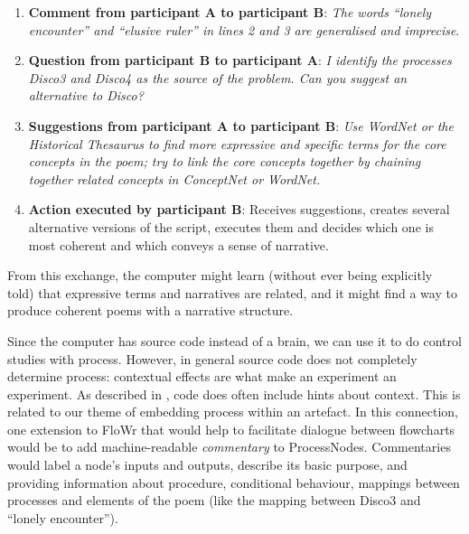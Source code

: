 \begin{enumerate}
\item \textbf{Comment from participant $\mathbf{A}$ to participant $\mathbf{B}$}: {\em The words ``lonely encounter'' and ``elusive ruler'' in lines 2 and 3 are generalised and imprecise}.
\item \textbf{Question from participant $\mathbf{B}$ to participant $\mathbf{A}$}: {\em I identify the processes {\em Disco3} and {\em Disco4} as the source of the problem. Can you suggest an alternative to Disco?} 
\item \textbf{Suggestions from participant $\mathbf{A}$ to participant $\mathbf{B}$}: {\em Use WordNet or the Historical Thesaurus to find more expressive and specific terms for the core concepts in the poem; try to link the core concepts together by chaining together related concepts in ConceptNet or WordNet.}%
\item \textbf{Action executed by participant $\mathbf{B}$}: Receives suggestions, creates several alternative versions of the script, executes them and decides which one is most coherent and which conveys a sense of narrative.
\end{enumerate}

\noindent From this exchange, the computer might learn (without ever being explicitly told) that expressive terms and narratives are related, and it might find a way to produce coherent poems with a narrative structure.

\medskip

Since the computer has source code instead of a brain, we can use it to do control studies with process.  However, in general source code does not completely determine process: contextual effects are what make an experiment an experiment.  As described in \cite{cook2013mechanics}, code does often include hints about context.  This is related to our theme of embedding process within an artefact.
%
In this connection, one extension to FloWr that would help to facilitate dialogue between flowcharts would be to add machine-readable \emph{commentary} to ProcessNodes.  Commentaries would label a node's inputs and outputs, describe its basic purpose, and providing information about procedure, conditional behaviour, mappings between processes and elements of the poem (like the mapping between Disco3 and ``lonely encounter''). 

